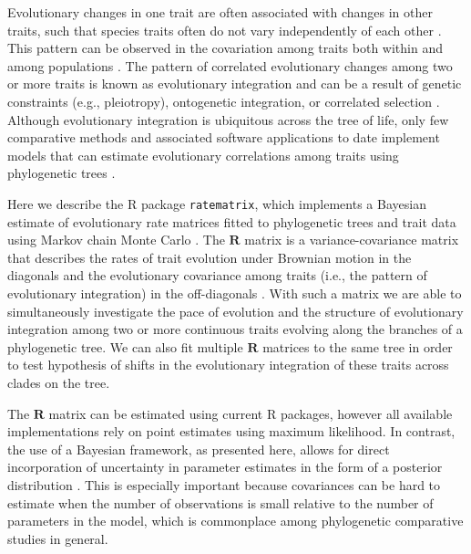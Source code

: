 Evolutionary changes in one trait are often associated with changes in other traits, such that species traits often do not vary independently of each other \citep{Olson_Miller_1958}. This pattern can be observed in the covariation among traits both within and among populations \citep{arnold_constraints_1992, arnold_adaptive_2001, revell_testing_2008, revell_phylogenetic_2009}. The pattern of correlated evolutionary changes among two or more traits is known as evolutionary integration and can be a result of genetic constraints (e.g., pleiotropy), ontogenetic integration, or correlated selection \citep{arnold_constraints_1992, arnold_adaptive_2001, pigliucci_evolvability_2004, goswami_fossil_2015, melo_modularity:_2016}. Although evolutionary integration is ubiquitous across the tree of life, only few comparative methods and associated software applications to date implement models that can estimate evolutionary correlations among traits using phylogenetic trees \citep{revell_testing_2008, hohenlohe_mipod:_2008, revell_phylogenetic_2009, bartoszek_phylogenetic_2012, adams_geomorph:_2013, Clavel_mvmorph, goolsby_rphylopars:_2016}. 

Here we describe the R package \texttt{ratematrix}, which implements a Bayesian estimate of evolutionary rate matrices \citep[ $\mathbf{R}$;][]{revell_testing_2008} fitted to phylogenetic trees and trait data using Markov chain Monte Carlo \citep[as described in][]{caetano_sysbio_2017}. The $\mathbf{R}$ matrix is a variance-covariance matrix that describes the rates of trait evolution under Brownian motion in the diagonals and the evolutionary covariance among traits (i.e., the pattern of evolutionary integration) in the off-diagonals \citep{revell_testing_2008, revell_phylogenetic_2009, adams_assessing_2014}. With such a matrix we are able to simultaneously investigate the pace of evolution and the structure of evolutionary integration among two or more continuous traits evolving along the branches of a phylogenetic tree. We can also fit multiple $\mathbf{R}$ matrices to the same tree in order to test hypothesis of shifts in the evolutionary integration of these traits across clades on the tree. 

The $\mathbf{R}$ matrix can be estimated using current R packages, however all available implementations rely on point estimates using maximum likelihood. In contrast, the use of a Bayesian framework, as presented here, allows for direct incorporation of uncertainty in parameter estimates in the form of a posterior distribution \citep{caetano_sysbio_2017}. This is especially important because covariances can be hard to estimate when the number of observations is small relative to the number of parameters in the model, which is commonplace among phylogenetic comparative studies in general.

